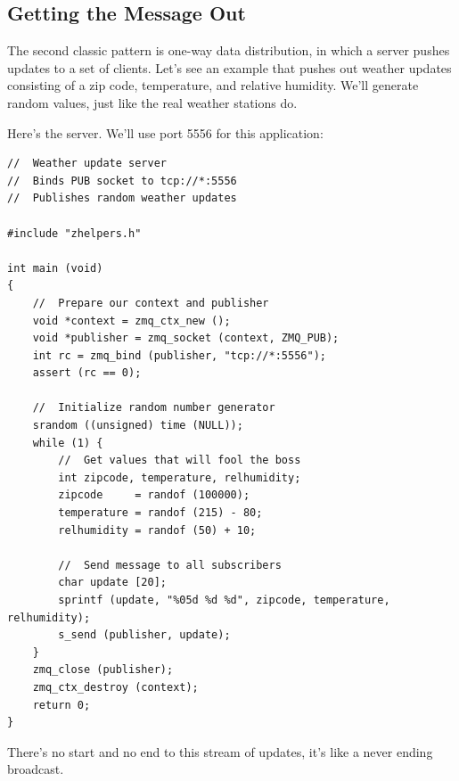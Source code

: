 \subsection{Getting the Message Out}

The second classic pattern is one-way data distribution, in which a server
pushes updates to a set of clients. Let's see an example that pushes out
weather updates consisting of a zip code, temperature, and relative humidity.
We'll generate random values, just like the real weather stations do.

Here's the server. We'll use port 5556 for this application:
\begin{verbatim}
//  Weather update server
//  Binds PUB socket to tcp://*:5556
//  Publishes random weather updates

#include "zhelpers.h"

int main (void)
{
    //  Prepare our context and publisher
    void *context = zmq_ctx_new ();
    void *publisher = zmq_socket (context, ZMQ_PUB);
    int rc = zmq_bind (publisher, "tcp://*:5556");
    assert (rc == 0);

    //  Initialize random number generator
    srandom ((unsigned) time (NULL));
    while (1) {
        //  Get values that will fool the boss
        int zipcode, temperature, relhumidity;
        zipcode     = randof (100000);
        temperature = randof (215) - 80;
        relhumidity = randof (50) + 10;

        //  Send message to all subscribers
        char update [20];
        sprintf (update, "%05d %d %d", zipcode, temperature, relhumidity);
        s_send (publisher, update);
    }
    zmq_close (publisher);
    zmq_ctx_destroy (context);
    return 0;
}
\end{verbatim}
There's no start and no end to this stream of updates, it's like a never ending
broadcast. 
\inputminted[baselinestretch=0.8,stripnl=false]{scheme}{../tests/publish-subscribe/server.scm}
\inputminted[baselinestretch=0.8,stripnl=false]{scheme}{../tests/publish-subscribe/server-sugar.scm}

